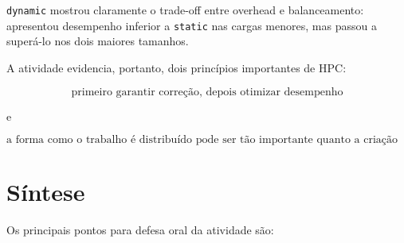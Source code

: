 \texttt{dynamic} mostrou claramente o trade-off entre overhead e
balanceamento: apresentou desempenho inferior a \texttt{static} nas cargas
menores, mas passou a superá-lo nos dois maiores tamanhos.

A atividade evidencia, portanto, dois princípios importantes de HPC:

\[
\boxed{
\text{primeiro garantir correção, depois otimizar desempenho}
}
\]

e

\[
\boxed{
\text{a forma como o trabalho é distribuído pode ser tão importante
quanto a criação das threads}
}
\]


\section{Síntese}
\label{sec:atvd07-defesa}

Os principais pontos para defesa oral da atividade são:

